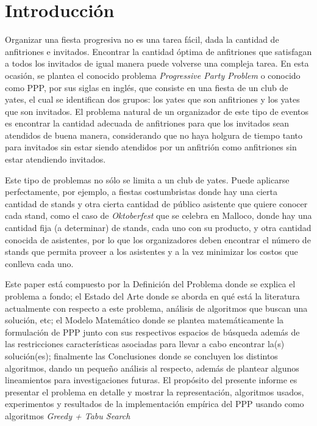\documentclass[letter, 10pt]{article}
\begin{document}
\section{Introducción}

Organizar una fiesta progresiva no es una tarea fácil, dada la cantidad de anfitriones e invitados. Encontrar la cantidad óptima de anfitriones que satisfagan a todos los invitados de igual manera puede volverse una compleja tarea. En esta ocasión, se plantea el conocido problema \textit{Progressive Party Problem} o conocido como PPP, por sus siglas en inglés, que consiste en una fiesta de un club de yates, el cual se identifican dos grupos: los yates que son anfitriones y los yates que son invitados. El problema natural de un organizador de este tipo de eventos es encontrar la cantidad adecuada de anfitriones para que los invitados sean atendidos de buena manera, considerando que no haya holgura de tiempo tanto para invitados sin estar siendo atendidos por un anfitrión como anfitriones sin estar atendiendo invitados.

Este tipo de problemas no sólo se limita a un club de yates. Puede aplicarse perfectamente, por ejemplo, a fiestas costumbristas donde hay una cierta cantidad de stands y otra cierta cantidad de público asistente que quiere conocer cada stand, como el caso de \textit{Oktoberfest} que se celebra en Malloco, donde hay una cantidad fija (a determinar) de stands, cada uno con su producto, y otra cantidad conocida de asistentes, por lo que los organizadores deben encontrar el número de stands que permita proveer a los asistentes y a la vez minimizar los costos que conlleva cada uno.

Este paper está compuesto por la Definición del Problema donde se explica el problema a fondo; el Estado del Arte donde se aborda en qué está la literatura actualmente con respecto a este problema, análisis de algoritmos que buscan una solución, etc; el Modelo Matemático donde se plantea matemáticamente la formulación de PPP junto con sus respectivos espacios de búsqueda además de las restricciones características asociadas para llevar a cabo encontrar la(s) solución(es); finalmente las Conclusiones donde se concluyen los distintos algoritmos, dando un pequeño análisis al respecto, además de plantear algunos lineamientos para investigaciones futuras. El propósito del presente informe es presentar el problema en detalle y mostrar la representación, algoritmos usados, experimentos y resultados de la implementación empírica del PPP usando como algoritmos \textit{Greedy + Tabu Search}
\end{document}
